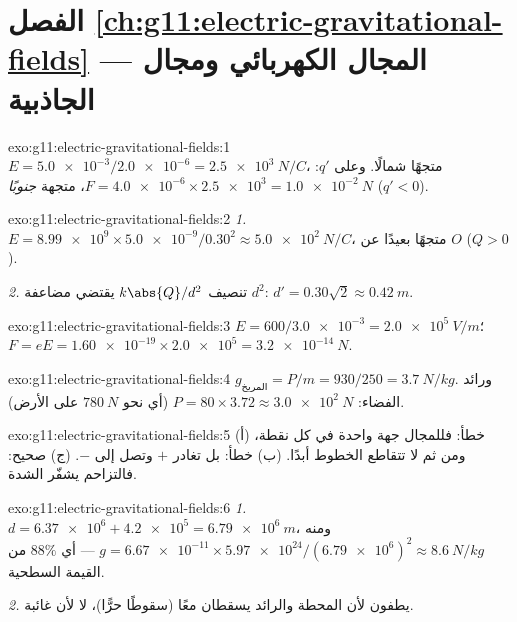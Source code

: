 \section*{الفصل \ref{ch:g11:electric-gravitational-fields} --- المجال الكهربائي ومجال الجاذبية}

\begin{solution}{exo:g11:electric-gravitational-fields:1}
$E = \num{5.0e-3} / \num{2.0e-6} = \qty{2.5e3}{N/C}$، متجهًا شمالًا.
وعلى $q'$: $F = \num{4.0e-6} \times \num{2.5e3} = \qty{1.0e-2}{N}$،
متجهة \emph{جنوبًا} ($q' < 0$).
\end{solution}

\begin{solution}{exo:g11:electric-gravitational-fields:2}
\emph{1.} $E = \num{8.99e9} \times \num{5.0e-9} / 0.30^2
\approx \qty{5.0e2}{N/C}$، متجهًا بعيدًا عن $O$ ($Q > 0$).

\emph{2.} تنصيف $k\abs{Q}/d^2$ يقتضي مضاعفة $d^2$:
$d' = 0.30\sqrt{2} \approx \qty{0.42}{m}$.
\end{solution}

\begin{solution}{exo:g11:electric-gravitational-fields:3}
$E = 600 / \num{3.0e-3} = \qty{2.0e5}{V/m}$؛
$F = eE = \num{1.60e-19} \times \num{2.0e5} = \qty{3.2e-14}{N}$.
\end{solution}

\begin{solution}{exo:g11:electric-gravitational-fields:4}
$g_{\text{المريخ}} = P/m = 930/250 = \qty{3.7}{N/kg}$. ورائد الفضاء:
$P = 80 \times 3.72 \approx \qty{3.0e2}{N}$ (أي نحو $\qty{780}{N}$ على
الأرض).
\end{solution}

\begin{solution}{exo:g11:electric-gravitational-fields:5}
(أ) خطأ: فللمجال جهة واحدة في كل نقطة، ومن ثم لا تتقاطع الخطوط
أبدًا. (ب) خطأ: بل تغادر $+$ وتصل إلى $-$. (ج) صحيح: فالتزاحم
يشفّر الشدة.
\end{solution}

\begin{solution}{exo:g11:electric-gravitational-fields:6}
\emph{1.} $d = \num{6.37e6} + \num{4.2e5} = \qty{6.79e6}{m}$، ومنه
$g = \num{6.67e-11} \times \num{5.97e24} / (\num{6.79e6})^2
\approx \qty{8.6}{N/kg}$ --- أي $88\%$ من القيمة السطحية.

\emph{2.} يطفون لأن المحطة والرائد يسقطان معًا (سقوطًا
حرًّا)، لا لأن  غائبة.
\end{solution}

